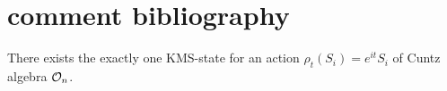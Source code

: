 \section{comment bibliography}
\cite{olesen1978some} There exists the exactly one KMS-state for an action $\rho_t(S_i) = e^{it}S_i$ of Cuntz algebra $\mathcal{O}_n$.\\
